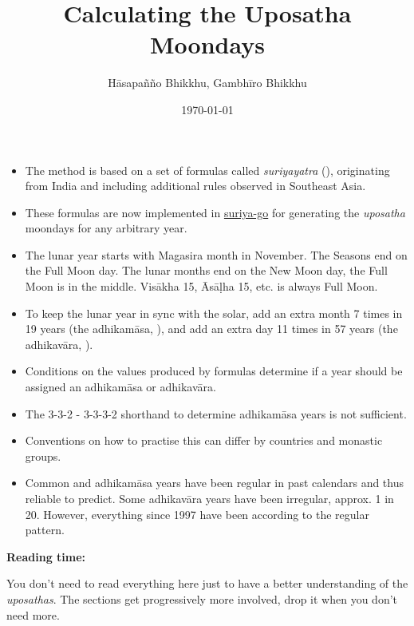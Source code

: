 \documentclass[11pt,oneside]{memoir-article}
\author{Hāsapañño Bhikkhu, Gambhīro Bhikkhu}
\date{\today}
\title{Calculating the Uposatha Moondays}
\begin{document}
\maketitle
\begin{tldr}
\begin{itemize}
\item The method is based on a set of formulas called \emph{suriyayatra} (),
originating from India and including additional rules observed in Southeast
Asia.
\item These formulas are now implemented in \href{https://github.com/splendidmoons/suriya-go}{suriya-go} for generating the \emph{uposatha}
  moondays for any arbitrary year.
\item The lunar year starts with Magasira month in November. The Seasons end on the
Full Moon day. The lunar months end on the New Moon day, the Full Moon is in
the middle. Visākha 15, Āsāḷha 15, etc. is always Full Moon.
\item To keep the lunar year in sync with the solar, add an extra month 7 times in
19 years (the adhikamāsa, ), and add an extra day 11 times in 57
years (the adhikavāra, ).
\item Conditions on the values produced by formulas determine if a year should be
assigned an adhikamāsa or adhikavāra.
\item The 3-3-2 - 3-3-3-2 shorthand to determine adhikamāsa years is not sufficient.
\item Conventions on how to practise this can differ by countries and monastic groups.
\item Common and adhikamāsa years have been regular in past calendars and thus
reliable to predict. Some adhikavāra years have been irregular, approx. 1
in 20. However, everything since 1997 have been according to the regular
pattern.
\end{itemize}
\end{tldr}

\thispagestyle{empty}


{\centering\large\bfseries
Reading time:
\par}

You don't need to read everything here just to have a better understanding of
the \emph{uposathas}. The sections get progressively more involved, drop it when you
don't need more.
\end{document}
